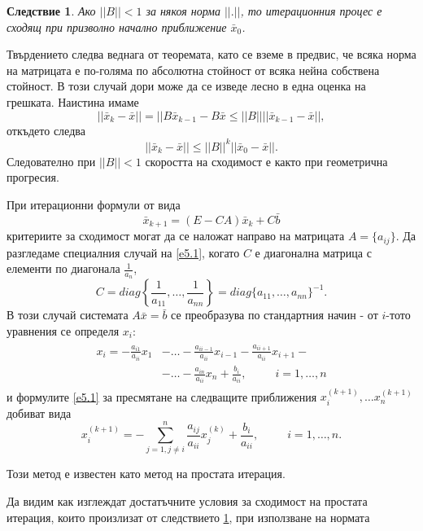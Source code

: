 \documentclass[12pt]{article}
\numberwithin{equation}{section}
\newtheorem{corollary}{Следствие}
\numberwithin{theorem}{section}
\numberwithin{definition}{section}
\numberwithin{corollary}{section}
\begin{document}
\begin{corollary}\label{c5.1}
Ако $||B||<1$ за някоя норма $||.||$, то итерационния процес е сходящ при призволно начално приближение $\bar{x}_0$.
\end{corollary}
\par
Твърдението следва веднага от теоремата, като се вземе в предвис, че всяка норма на матрицата е по-голяма по абсолютна стойност от всяка нейна собствена стойност. В този случай дори може да се изведе лесно в една оценка на грешката. Наистина имаме
\[
||\bar{x}_k-\bar{x}||=||B\bar{x}_{k-1}-B\bar{x}\leq ||B||||\bar{x}_{k-1}-\bar{x}||,
\]
откъдето следва
\[
||\bar{x}_k-\bar{x}||\leq||B||^k||\bar{x}_0-\bar{x}||.
\]
Следователно при $||B||<1$ скоростта на сходимост е както при геометрична прогресия.
\par
При итерационни формули от вида
\begin{equation}\label{e5.1}
\bar{x}_{k+1}=(E-CA)\bar{x}_k+C\bar{b} %
\end{equation}
критериите за сходимост могат да се наложат направо на матрицата $A=\{a_{ij}\}$. Да разгледаме специалния случай на \ref{e5.1}, когато $C$ е диагонална матрица с елементи по диагонала $\frac{1}{a_n}$,
\[
C=diag\left\{\frac{1}{a_{11}},\dotso,\frac{1}{a_{nn}}\right\}=diag\{a_{11},\dotso,a_{nn}\}^{-1}.
\]
В този случай системата $A\bar{x}=\bar{b}$ се преобразува по стандартния начин - от $i$-тото уравнения се определя $x_i:$
\begin{align*}
\begin{split}
x_i=-\frac{a_{i1}}{a_{ii}}x_1 &-\dotso-\frac{a_{ii-1}}{a_{ii}}x_{i-1}-\frac{a_{ii+1}}{a_{ii}}x_{i+1}-\\&-\dotso-\frac{a_{in}}{a_{ii}}x_n+\frac{b_i}{a_{ii}},\hspace{30pt}i=1,\dotso,n
\end{split}
\end{align*}
и формулите \ref{e5.1} за пресмятане на следващите приближения $x_i^{(k+1)},\dotso x_n^{(k+1)}$ добиват вида
\begin{equation}\label{e5.2}
x_i^{(k+1)} = -\displaystyle\sum_{j=1,j\neq i}^n\frac{a_{ij}}{a_{ii}}x_j^{(k)}+\frac{b_i}{a_{ii}},\hspace{30pt}i=1,\dotso,n.
\end{equation}
\par
Този метод е известен като метод на простата итерация.
\par
Да видим как изглеждат достатъчните условия за сходимост на простата итерация, които произлизат от следствието \ref{c5.1}, при използване на нормата
\end{document}
